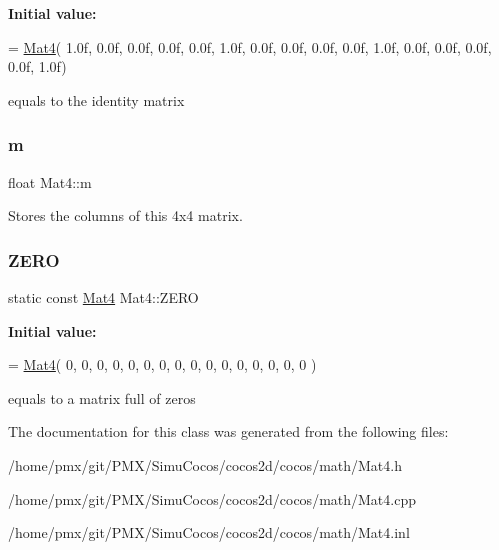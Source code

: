 {\bfseries Initial value\+:}
\begin{DoxyCode}
= \hyperlink{classMat4_ab26a891e96114b174d518adaf9059db5}{Mat4}(
                    1.0f, 0.0f, 0.0f, 0.0f,
                    0.0f, 1.0f, 0.0f, 0.0f,
                    0.0f, 0.0f, 1.0f, 0.0f,
                    0.0f, 0.0f, 0.0f, 1.0f)
\end{DoxyCode}
equals to the identity matrix \mbox{\label{classMat4_aabd2ecf01c45dbe87060754036a3c763}} 
\subsubsection{\texorpdfstring{m}{m}}
{\footnotesize\ttfamily float Mat4\+::m}

Stores the columns of this 4x4 matrix. \mbox{\label{classMat4_ad362a417d8a274550042473c43bdfb92}} 
\subsubsection{\texorpdfstring{Z\+E\+RO}{ZERO}}
{\footnotesize\ttfamily static const \hyperlink{classMat4}{Mat4} Mat4\+::\+Z\+E\+RO\hspace{0.3cm}{\ttfamily [static]}}

{\bfseries Initial value\+:}
\begin{DoxyCode}
= \hyperlink{classMat4_ab26a891e96114b174d518adaf9059db5}{Mat4}(
                    0, 0, 0, 0,
                    0, 0, 0, 0,
                    0, 0, 0, 0,
                    0, 0, 0, 0 )
\end{DoxyCode}
equals to a matrix full of zeros 

The documentation for this class was generated from the following files\+:\begin{DoxyCompactItemize}
\item 
/home/pmx/git/\+P\+M\+X/\+Simu\+Cocos/cocos2d/cocos/math/Mat4.\+h\item 
/home/pmx/git/\+P\+M\+X/\+Simu\+Cocos/cocos2d/cocos/math/Mat4.\+cpp\item 
/home/pmx/git/\+P\+M\+X/\+Simu\+Cocos/cocos2d/cocos/math/Mat4.\+inl\end{DoxyCompactItemize}

